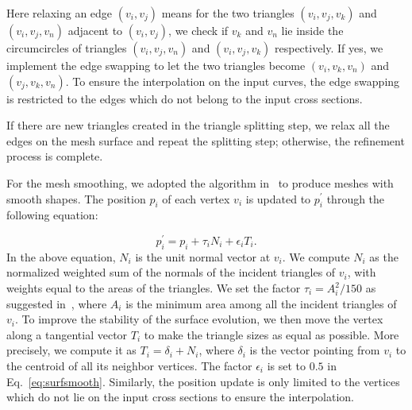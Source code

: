 Here relaxing an edge $(v_i, v_j)$ means for the two triangles $(v_i, v_j, v_k)$ and
$(v_i, v_j, v_n)$ adjacent to $(v_i, v_j)$, we check if $v_k$ and $v_n$ lie inside
the circumcircles of triangles $(v_i, v_j, v_n)$ and $(v_i, v_j, v_k)$ respectively.
If yes, we implement the edge swapping to let the two triangles become
$(v_i, v_k, v_n)$ and $(v_j, v_k, v_n)$. To ensure the interpolation on the input curves,
the edge swapping is restricted to the edges which do not belong to the input cross sections.

If there are new triangles created in the triangle splitting step, we relax all the edges
on the mesh surface and repeat the splitting step; otherwise, the refinement process is complete.


For the mesh smoothing, we adopted the algorithm in~\cite{YB02} to produce meshes
with smooth shapes. The position $p_i$ of each vertex $v_i$ is updated to $p^\prime_i$
through the following equation:

\begin{equation}
\label{eq:surfsmooth}
    p^\prime_i = p_i + \tau_i N_i + \epsilon_i T_i.
\end{equation}
In the above equation, $N_i$ is the unit normal vector at $v_i$. We compute $N_i$
as the normalized weighted sum of the normals of the incident triangles of $v_i$,
with weights equal to the areas of the triangles. We set the factor
$\tau_i = A_i^2/150$ as suggested in~\cite{YB02}, where $A_i$ is the minimum area
among all the incident triangles of $v_i$. To improve the stability of the surface
evolution, we then move the vertex along a tangential vector $T_i$ to make
the triangle sizes as equal as possible. More precisely, we compute it
as $T_i = \delta_i + N_i$, where $\delta_i$ is the vector pointing from $v_i$
to the centroid of all its neighbor vertices. The factor $\epsilon_i$
is set to $0.5$ in Eq.~\ref{eq:surfsmooth}. Similarly, the position update is only
limited to the vertices which do not lie on the input cross sections
to ensure the interpolation.



